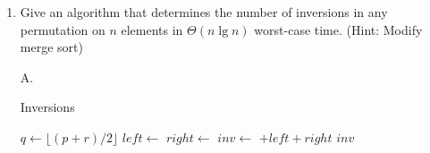\documentclass[fontsize=12pt,paper=a4]{book}
\begin{document}
\begin{enumerate}
\begin{enumerate}
        \item Give an algorithm that determines the number of inversions in any permutation on $n$ elements in $\Theta(n \lg n)$ worst-case time. (Hint: Modify merge sort)
        \item[A.]
              \begin{algorithm}
               \caption{Inversions}
               \begin{algorithmic}
                \State $q \gets \lfloor (p+r)/2 \rfloor $
                \State $left \gets$ 
                \State $right \gets$ 
                \State $inv \gets$ $ + left + right$
                \State \Return $inv$
                \EndIf
                \State {}
                \EndProcedure
               \end{algorithmic}
              \end{algorithm}
              

\end{enumerate}
\end{enumerate}
\end{document}
